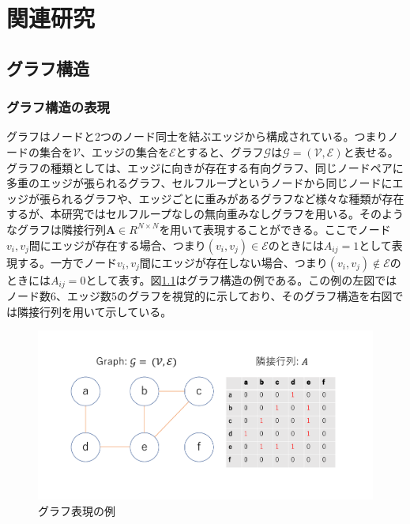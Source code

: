 \chapter{関連研究}
\section{グラフ構造}
\subsection{グラフ構造の表現}
グラフはノードと2つのノード同士を結ぶエッジから構成されている。つまりノードの集合を$\mathcal{V}$、エッジの集合を$\mathcal{E}$とすると、グラフ$\mathcal{G}$は$\mathcal{G} = (\mathcal{V},\mathcal{E})$と表せる。グラフの種類としては、エッジに向きが存在する有向グラフ、同じノードペアに多重のエッジが張られるグラフ、セルフループというノードから同じノードにエッジが張られるグラフや、エッジごとに重みがあるグラフなど様々な種類が存在するが、本研究ではセルフループなしの無向重みなしグラフを用いる。そのようなグラフは隣接行列$\mathbf{A} \in R^{N \times N}$を用いて表現することができる。ここでノード$v_i,v_j$間にエッジが存在する場合、つまり$(v_{i},v_{j}) \in \mathcal{E}$のときには$A_{ij} = 1$として表現する。一方でノード$v_i,v_j$間にエッジが存在しない場合、つまり$(v_{i},v_{j}) \notin \mathcal{E}$のときには$A_{ij} = 0$として表す。図\ref{fig:graph}はグラフ構造の例である。この例の左図ではノード数6、エッジ数5のグラフを視覚的に示しており、そのグラフ構造を右図では隣接行列を用いて示している。

\begin{figure}[tb]
  \centering
  \includegraphics[width=0.8\hsize]{figures/graph_structure.pdf}
  \caption{グラフ表現の例}
  \label{fig:graph}
\end{figure}

